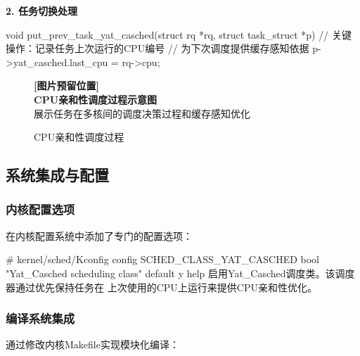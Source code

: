 \begin{tcolorbox}[
    colback=orange!5!white,
    colframe=orange!50!black,
    title=\textbf{任务切换处理实现},
    fonttitle=\bfseries,
    arc=3pt
]
\textbf{2. 任务切换处理}
\begin{code}
void put_prev_task_yat_casched(struct rq *rq,
                               struct task_struct *p) {
    // 关键操作：记录任务上次运行的CPU编号
    // 为下次调度提供缓存感知依据
    p->yat_casched.last_cpu = rq->cpu;
}
\end{code}
\end{tcolorbox}

\begin{figure}[htbp]
\centering
\begin{tcolorbox}[
    colback=gray!10,
    colframe=gray!50,
    width=0.9\textwidth,
    center,
    arc=3pt
]
\centering
\textbf{[图片预留位置]}\\
\textbf{CPU亲和性调度过程示意图}\\
\footnotesize{展示任务在多核间的调度决策过程和缓存感知优化}
\end{tcolorbox}
\caption{CPU亲和性调度过程}
\label{fig:cpu_affinity}
\end{figure}

\subsection{系统集成与配置}

\subsubsection{内核配置选项}

在内核配置系统中添加了专门的配置选项：

\begin{code}
# kernel/sched/Kconfig
config SCHED_CLASS_YAT_CASCHED
    bool "Yat_Casched scheduling class"
    default y
    help
      启用Yat_Casched调度类。该调度器通过优先保持任务在
      上次使用的CPU上运行来提供CPU亲和性优化。
\end{code}

\subsubsection{编译系统集成}

通过修改内核Makefile实现模块化编译：



